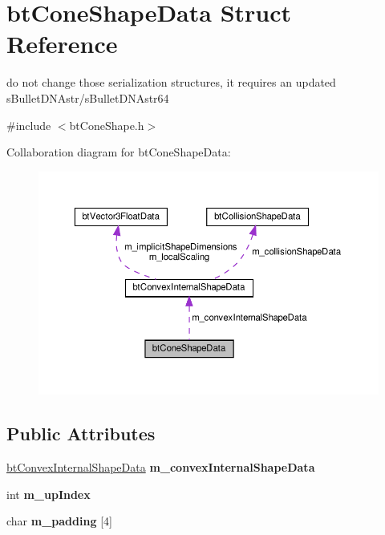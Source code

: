 \hypertarget{structbtConeShapeData}{}\section{bt\+Cone\+Shape\+Data Struct Reference}
\label{structbtConeShapeData}


do not change those serialization structures, it requires an updated s\+Bullet\+D\+N\+Astr/s\+Bullet\+D\+N\+Astr64  




{\ttfamily \#include $<$bt\+Cone\+Shape.\+h$>$}



Collaboration diagram for bt\+Cone\+Shape\+Data\+:
\nopagebreak
\begin{figure}[H]
\begin{center}
\leavevmode
\includegraphics[width=350pt]{structbtConeShapeData__coll__graph}
\end{center}
\end{figure}
\subsection*{Public Attributes}
\begin{DoxyCompactItemize}
\item 
\mbox{\label{structbtConeShapeData_a5d57df88ebfa97bf1c3c3f148698f9bd}} 
\hyperlink{structbtConvexInternalShapeData}{bt\+Convex\+Internal\+Shape\+Data} {\bfseries m\+\_\+convex\+Internal\+Shape\+Data}
\item 
\mbox{\label{structbtConeShapeData_ab69c236550921a6fe7bde4dca157df07}} 
int {\bfseries m\+\_\+up\+Index}
\item 
\mbox{\label{structbtConeShapeData_ab32492fb8a6f23894bd344fdbad359ce}} 
char {\bfseries m\+\_\+padding} \mbox{[}4\mbox{]}
\end{DoxyCompactItemize}


